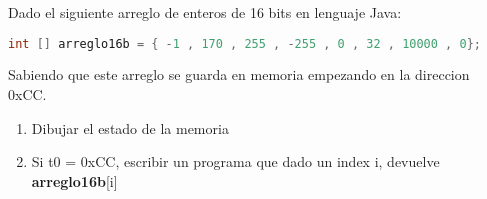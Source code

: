\begin{enunciado}{\ejercicio}
    Dado el siguiente arreglo de enteros de 16 bits en lenguaje Java:

    \begin{mdframed}[backgroundcolor=light-gray, roundcorner=10pt,leftmargin=1, rightmargin=1, innerleftmargin=15, innertopmargin=1.5,innerbottommargin=1.5, outerlinewidth=1, linecolor=light-gray]
    \begin{lstlisting}[language=Java]
        int [] arreglo16b = { -1 , 170 , 255 , -255 , 0 , 32 , 10000 , 0};
    \end{lstlisting}
    \end{mdframed}

    Sabiendo que este arreglo se guarda en memoria empezando en la direccion 0xCC.

    \begin{enumerate}
        \item Dibujar el estado de la memoria
        \item Si t0 = 0xCC, escribir un programa que dado un index i, devuelve \textbf{arreglo16b}[i]
    \end{enumerate}
    \end{enunciado}

